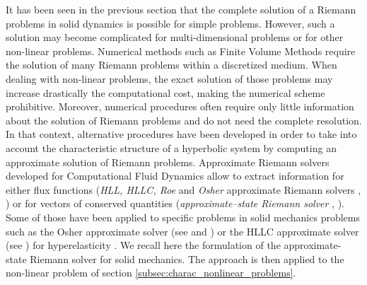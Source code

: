 It has been seen in the previous section that the complete solution of a Riemann problems in solid dynamics is possible for simple problems. However, such a solution may become complicated for multi-dimensional problems or for other non-linear problems. 
Numerical methods such as Finite Volume Methods \cite{Leveque} require the solution of many Riemann problems within a discretized medium. When dealing with non-linear problems, the exact solution of those problems may increase drastically the computational cost, making the numerical scheme prohibitive. Moreover, numerical procedures often require only little information about the solution of Riemann problems and do not need the complete resolution. In that context, alternative procedures have been developed in order to take into account the characteristic structure of a hyperbolic system by computing an approximate solution of Riemann problems. Approximate Riemann solvers developed for Computational Fluid Dynamics allow to extract information for either flux functions (\textit{HLL, HLLC, Roe} and \textit{Osher} approximate Riemann solvers \cite{Trangenstein}, \cite{Toro}) or for vectors of conserved quantities (\textit{approximate--state Riemann solver} \cite[Ch.9]{Toro}, \cite[Ch.22]{Leveque}). Some of those have been applied to specific problems in solid mechanics problems such as the Osher approximate solver (see \cite{LEE_FVM} and \cite{Haider_FVM}) or the HLLC approximate solver (see \cite{Ortega_HLLD}) for hyperelasticity . We recall here the formulation of the approximate-state Riemann solver for solid mechanics. The approach is then applied to the non-linear problem of section \ref{subsec:charac_nonlinear_problems}.

